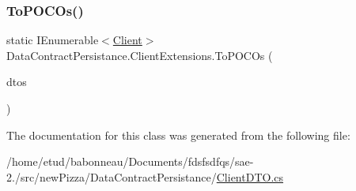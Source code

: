 \mbox{\label{classDataContractPersistance_1_1ClientExtensions_aad7988e164f80a2cb19a3d1262f7dbdf}} 
\subsubsection{\texorpdfstring{To\+P\+O\+C\+Os()}{ToPOCOs()}\hspace{0.1cm}{\footnotesize\ttfamily [2/2]}}
{\footnotesize\ttfamily static I\+Enumerable$<$\hyperlink{classModele_1_1Client}{Client}$>$ Data\+Contract\+Persistance.\+Client\+Extensions.\+To\+P\+O\+C\+Os (\begin{DoxyParamCaption}\item[{this I\+Enumerable$<$ \hyperlink{classDataContractPersistance_1_1ClientDTO}{Client\+D\+TO} $>$}]{dtos }\end{DoxyParamCaption})\hspace{0.3cm}{\ttfamily [static]}}



The documentation for this class was generated from the following file\+:\begin{DoxyCompactItemize}
\item 
/home/etud/babonneau/\+Documents/fdsfsdfqs/sae-\/2./src/new\+Pizza/\+Data\+Contract\+Persistance/\hyperlink{ClientDTO_8cs}{Client\+D\+T\+O.\+cs}\end{DoxyCompactItemize}
